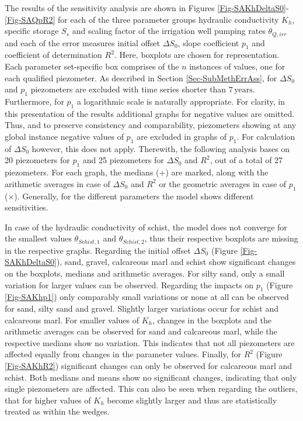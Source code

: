The results of the sensitivity analysis are shown in Figures \ref{Fig-SAKhDeltaS0}-\ref{Fig-SAQpR2} for each of the three parameter groups hydraulic conductivity $K_h$, specific storage $S_s$ and scaling factor of the irrigation well pumping rates $\theta_{Q,irr}$ and each of the error measures initial offset $\Delta S_0$, slope coefficient $p_1$ and coefficient of determination $R^2$. 
Here, boxplots are chosen for representation. 
Each parameter set-specific box comprises of the $n$ instances of values, one for each qualified piezometer. 
As described in Section \ref{Sec-SubMethErrAss}, for $\Delta S_0$ and $p_1$ piezometers are excluded with time series shorter than $7 \, \textrm{years}$. 
Furthermore, for $p_1$ a logarithmic scale is naturally appropriate. 
For clarity, in this presentation of the results additional graphs for negative values are omitted. 
Thus, and to preserve consistency and comparability, piezometers showing at any global instance negative values of $p_1$ are excluded in graphs of $p_1$. 
For calculation of $\Delta S_0$ however, this does not apply. 
Therewith, the following analysis bases on 20 piezometers for $p_1$ and 25 piezometers for $\Delta S_0$ and $R^2$, out of a total of 27 piezometers. 
For each graph, the medians ($\bm{+}$) are marked, along with the arithmetic averages in case of $\Delta S_0$ and $R^2$ or the geometric averages in case of $p_1$ ($\bm{\times}$). 
Generally, for the different parameters the model shows different sensitivities.

In case of the hydraulic conductivity of schist, the model does not converge for the smallest values $\theta_{Schist,1}$ and $\theta_{Schist,2}$, thus their respective boxplots are missing in the respective graphs. 
Regarding the initial offset $\Delta S_0$ (Figure \ref{Fig-SAKhDeltaS0}), sand, gravel, calcareous marl and schist show significant changes on the boxplots, medians and arithmetic averages. 
For silty sand, only a small variation for larger values can be observed. 
Regarding the impacts on $p_1$ (Figure \ref{Fig-SAKhp1}) only comparably small variations or none at all can be observed for sand, silty sand and gravel. 
Slightly larger variations occur for schist and calcareous marl. 
For smaller values of $K_h$, changes in the boxplots and the arithmetic averages can be observed for sand and calcareous marl, while the respective medians show no variation. 
This indicates that not all piezometers are affected equally from changes in the parameter values. 
Finally, for $R^2$ (Figure \ref{Fig-SAKhR2}) significant changes can only be observed for calcareous marl and schist. 
Both medians and means show no significant changes, indicating that only single piezometers are affected. 
This can also be seen when regarding the outliers, that for higher values of $K_h$ become slightly larger and thus are statistically treated as within the wedges.

